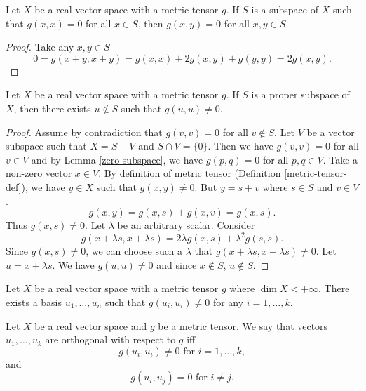\documentclass[main.tex]{subfiles}
\begin{document}
\begin{lemma}
\label{zero-subspace}
Let $X$ be a real vector space with a metric tensor $g$. If $S$ is a subspace of $X$ such that $g(x, x)=0$ for all $x\in S$, 
then $g(x, y) = 0$ for all $x, y\in S$.
\end{lemma}
\begin{proof}
Take any $x, y\in S$
\begin{equation}
0 = g(x + y, x + y) = g(x, x) + 2g(x,y) + g(y,y) = 2g(x,y).
\end{equation}
\end{proof}
\begin{lemma}
Let $X$ be a real vector space with a metric tensor $g$. If $S$ is a proper subspace of $X$, then there exists $u\not\in S$ such that $g(u, u) \not= 0$.
\end{lemma}
\begin{proof}
Assume by contradiction that $g(v, v)=0$ for all $v\not\in S$.
Let $V$ be a vector subspace such that $X = S + V$ and $S\cap V = \{0\}$. Then we have $g(v, v) =0$ for all $v\in V$ and by Lemma \ref{zero-subspace}, we have $g(p, q) = 0$ for all $p, q\in V$. Take a non-zero vector $x\in V$. By definition of metric tensor (Definition \ref{metric-tensor-def}), we have $y\in X$ such that $g(x,y)\not= 0$. But $y = s + v$ where $s\in S$ and $v\in V$.
\begin{equation}
g(x,y) = g(x,s) + g(x,v) = g(x,s).  
\end{equation}
Thus $g(x,s)\not = 0$. Let $\lambda$ be an arbitrary scalar.
Consider
\begin{equation}
g(x + \lambda s, x + \lambda s) = 2\lambda g(x, s) + \lambda^2 g(s, s).
\end{equation}
Since $g(x, s)\not= 0$, we can choose such a $\lambda$ that $g(x + \lambda s, x + \lambda s)\not = 0$. Let $u=x + \lambda s$. We have $g(u, u)\not =0$ and since $x\not\in S$, $u\not\in S$.   
\end{proof}
\begin{corollary}
Let $X$ be a real vector space with a metric tensor $g$ where $\dim X < +\infty$. There exists a basis $u_1, \dots, u_n$ such that $g(u_i, u_i)\not = 0$ for any $i=1, \dots, k$.
\end{corollary}

\begin{definition}
Let $X$ be a real vector space and $g$ be a metric tensor. We say that vectors $u_1, \dots, u_k$ are orthogonal with respect to $g$ iff 
\begin{equation}
g(u_i, u_i) \not=0 \text{ for } i=1, \dots, k,
\end{equation}
and
\begin{equation}
g(u_i, u_j) = 0 \text{ for } i\not=j. 
\end{equation}
\end{definition}
\end{document}
